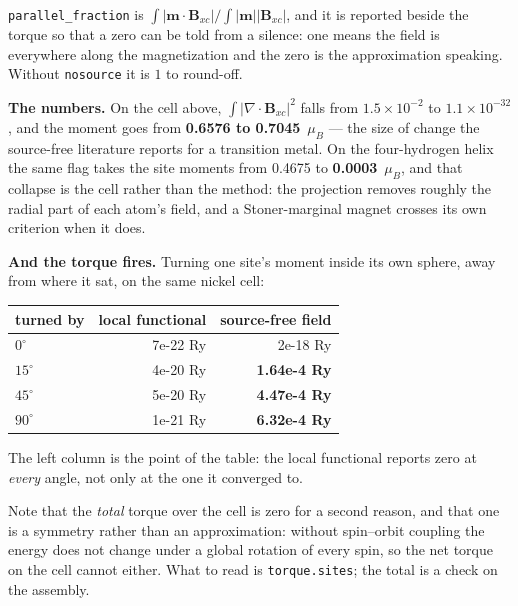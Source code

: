 \documentclass[11pt,a4paper]{article}
\newcommand{\code}[1]{\texttt{\small #1}}
\begin{document}
\code{parallel\_fraction} is
$\int|\mathbf m\cdot\mathbf B_{xc}| / \int|\mathbf m||\mathbf B_{xc}|$, and it
is reported beside the torque so that a zero can be told from a silence: one
means the field is everywhere along the magnetization and the zero is the
approximation speaking. Without \code{nosource} it is $1$ to round-off.

\textbf{The numbers.} On the cell above, $\int|\nabla\cdot\mathbf B_{xc}|^2$
falls from $1.5\times10^{-2}$ to $1.1\times10^{-32}$, and the moment goes from
\textbf{0.6576 to 0.7045}~$\mu_B$ --- the size of change the source-free
literature reports for a transition metal. On the four-hydrogen helix the same
flag takes the site moments from 0.4675 to \textbf{0.0003}~$\mu_B$, and that
collapse is the cell rather than the method: the projection removes roughly the
radial part of each atom's field, and a Stoner-marginal magnet crosses its own
criterion when it does.

\textbf{And the torque fires.} Turning one site's moment inside its own sphere,
away from where it sat, on the same nickel cell:

\begin{center}
\begin{tabular}{lrr}
\hline
turned by & local functional & source-free field \\
\hline
$0^\circ$  & 7e-22 Ry & 2e-18 Ry \\
$15^\circ$ & 4e-20 Ry & \textbf{1.64e-4 Ry} \\
$45^\circ$ & 5e-20 Ry & \textbf{4.47e-4 Ry} \\
$90^\circ$ & 1e-21 Ry & \textbf{6.32e-4 Ry} \\
\hline
\end{tabular}
\end{center}

The left column is the point of the table: the local functional reports zero at
\emph{every} angle, not only at the one it converged to.

Note that the \emph{total} torque over the cell is zero for a second reason, and
that one is a symmetry rather than an approximation: without spin--orbit
coupling the energy does not change under a global rotation of every spin, so
the net torque on the cell cannot either. What to read is
\code{torque.sites}; the total is a check on the assembly.
\end{document}
